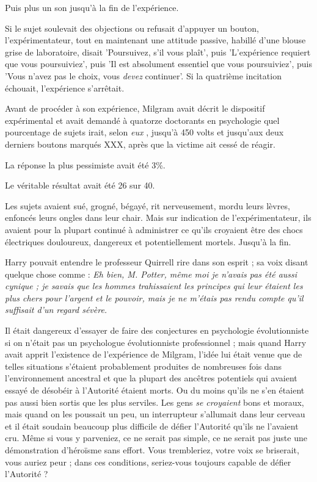 Puis plus un son jusqu'à la fin de l'expérience.

Si le sujet soulevait des objections ou refusait d'appuyer un bouton, l'expérimentateur, tout en maintenant une attitude passive, habillé d'une blouse grise de laboratoire, disait 'Poursuivez, s'il vous plaît', puis 'L'expérience requiert que vous poursuiviez', puis 'Il est absolument essentiel que vous poursuiviez', puis 'Vous n'avez pas le choix, vous \emph{devez}  continuer'. Si la quatrième incitation échouait, l'expérience s'arrêtait.

Avant de procéder à son expérience, Milgram avait décrit le dispositif expérimental et avait demandé à quatorze doctorants en psychologie quel pourcentage de sujets irait, selon \emph{eux} , jusqu'à 450 volts et jusqu'aux deux derniers boutons marqués XXX, après que la victime ait cessé de réagir.

La réponse la plus pessimiste avait été 3\%.

Le véritable résultat avait été 26 sur 40.

Les sujets avaient sué, grogné, bégayé, rit nerveusement, mordu leurs lèvres, enfoncés leurs ongles dans leur chair. Mais sur indication de l'expérimentateur, ils avaient pour la plupart continué à administrer ce qu'ils croyaient être des chocs électriques douloureux, dangereux et potentiellement mortels. Jusqu'à la fin.

Harry pouvait entendre le professeur Quirrell rire dans son esprit ; sa voix disant quelque chose comme : \emph{Eh bien, M. Potter, même moi je n'avais pas été aussi cynique ; je savais que les hommes trahissaient les principes qui leur étaient les plus chers pour l'argent et le pouvoir, mais je ne m'étais pas rendu compte qu'il suffisait d'un regard sévère.} 

Il était dangereux d'essayer de faire des conjectures en psychologie évolutionniste si on n'était pas un psychologue évolutionniste professionnel ; mais quand Harry avait apprit l'existence de l'expérience de Milgram, l'idée lui était venue que de telles situations s'étaient probablement produites de nombreuses fois dans l'environnement ancestral et que la plupart des ancêtres potentiels qui avaient essayé de désobéir à l'Autorité étaient morts. Ou du moins qu'ils ne s'en étaient pas aussi bien sortis que les plus serviles. Les gens \emph{se croyaient}  bons et moraux, mais quand on les poussait un peu, un interrupteur s'allumait dans leur cerveau et il était soudain beaucoup plus difficile de défier l'Autorité qu'ils ne l'avaient cru. Même si vous y parveniez, ce ne serait pas simple, ce ne serait pas juste une démonstration d'héroïsme sans effort. Vous trembleriez, votre voix se briserait, vous auriez peur ; dans ces conditions, seriez-vous toujours capable de défier l'Autorité ?

